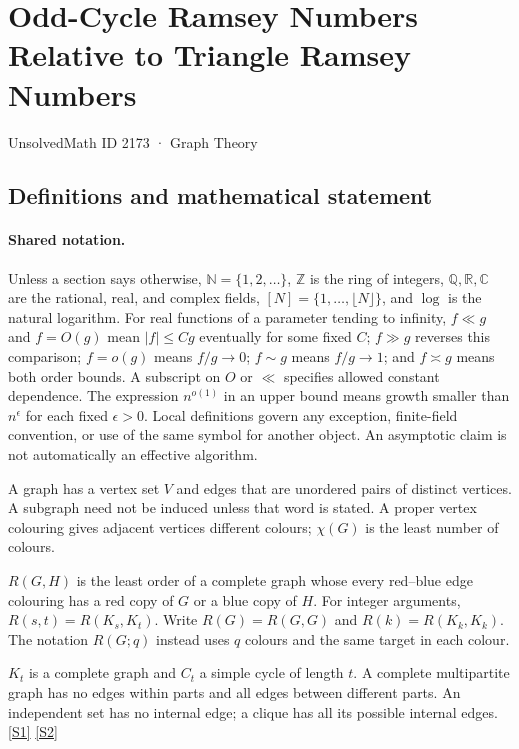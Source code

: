 \documentclass[11pt,a4paper]{article}
\newcommand{\N}{\mathbb{N}}
\newcommand{\Z}{\mathbb{Z}}
\newcommand{\Q}{\mathbb{Q}}
\newcommand{\R}{\mathbb{R}}
\newcommand{\C}{\mathbb{C}}
\newcommand{\sref}[2]{\hyperlink{source:#1:#2}{[S#2]}}
\begin{document}

\setcounter{section}{2172}

\section{Odd-Cycle Ramsey Numbers Relative to Triangle Ramsey Numbers}\label{2173}

{\small\sffamily UnsolvedMath ID 2173 · Graph Theory}

\subsection{Definitions and mathematical statement}

\paragraph{Shared notation.}Unless a section says otherwise, $\N=\{1,2,\ldots\}$,
$\Z$ is the ring of integers, $\Q,\R,\C$ are the rational, real, and complex
fields, $[N]=\{1,\ldots,\lfloor N\rfloor\}$, and $\log$ is the natural
logarithm. For real functions of a parameter tending to infinity,
$f\ll g$ and $f=O(g)$ mean $|f|\leq Cg$ eventually for some fixed $C$;
$f\gg g$ reverses this comparison; $f=o(g)$ means $f/g\to0$;
$f\sim g$ means $f/g\to1$; and $f\asymp g$ means both order bounds.
A subscript on $O$ or $\ll$ specifies allowed constant dependence.
The expression $n^{o(1)}$ in an upper bound means growth smaller than
$n^\epsilon$ for each fixed $\epsilon>0$. Local definitions govern any
exception, finite-field convention, or use of the same symbol for another
object. An asymptotic claim is not automatically an effective algorithm.



A graph has a vertex set $V$ and edges that are unordered pairs of distinct vertices. A subgraph need not be induced unless that word is stated. A proper vertex colouring gives adjacent vertices different colours; $\chi(G)$ is the least number of colours.

$R(G,H)$ is the least order of a complete graph whose every red--blue edge colouring has a red copy of $G$ or a blue copy of $H$. For integer arguments, $R(s,t)=R(K_s,K_t)$. Write $R(G)=R(G,G)$ and $R(k)=R(K_k,K_k)$. The notation $R(G;q)$ instead uses $q$ colours and the same target in each colour.

$K_t$ is a complete graph and $C_t$ a simple cycle of length $t$. A complete multipartite graph has no edges within parts and all edges between different parts. An independent set has no internal edge; a clique has all its possible internal edges. \sref{2173}{1} \sref{2173}{2}
\end{document}

